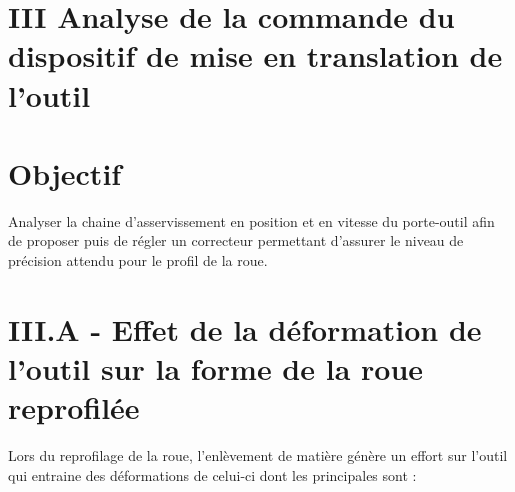 \documentclass[10pt]{article}
\begin{document}
\section*{III Analyse de la commande du dispositif de mise en translation de l'outil}
\section*{Objectif}
Analyser la chaine d'asservissement en position et en vitesse du porte-outil afin de proposer puis de régler un correcteur permettant d'assurer le niveau de précision attendu pour le profil de la roue.

\section*{III.A - Effet de la déformation de l'outil sur la forme de la roue reprofilée}
Lors du reprofilage de la roue, l'enlèvement de matière génère un effort sur l'outil qui entraine des déformations de celui-ci dont les principales sont :
\end{document}
